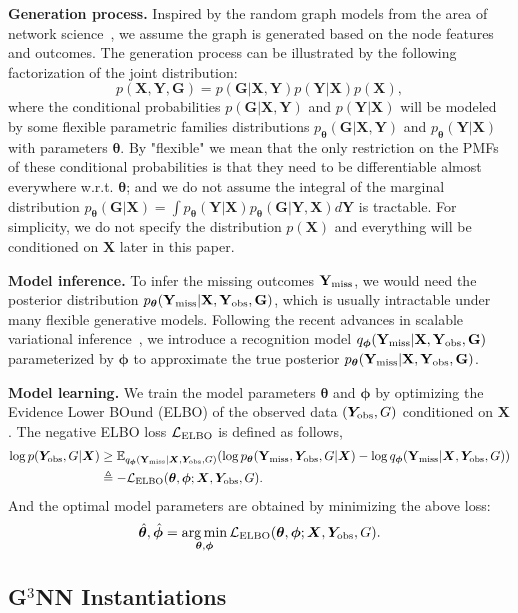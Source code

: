 \documentclass{article}
\newcommand{\vpara}[1]{\vspace{0.05in}\noindent\textbf{#1 }}
\def\rmG{{\mathbf{G}}}
\def\rmX{{\mathbf{X}}}
\def\rmY{{\mathbf{Y}}}
\def\vtheta{{\bm{\theta}}}
\def\mX{{\bm{X}}}
\def\mY{{\bm{Y}}}
\def\gL{{\mathcal{L}}}
\newcommand{\E}{\mathbb{E}}
\DeclareMathOperator*{\argmin}{arg\,min}
\newcommand{\Yobs}{\mY_{\rm{obs}}}
\newcommand{\rYmiss}{\rmY_{\rm{miss}}}
\newcommand{\rYobs}{\rmY_{\rm{obs}}}
\def\vphi{{\bm{\phi}}}
\begin{document}
\vpara{Generation process.} Inspired by the random graph models from the area of network science~\cite{newman2010networks}, we assume the graph is generated based on the node features and outcomes. The generation process can be illustrated by the following factorization of the joint distribution:
	$$p(\rmX, \rmY, \rmG) = p(\rmG|\rmX, \rmY)p(\rmY|\rmX)p(\rmX),$$
where the conditional probabilities $p(\rmG|\rmX, \rmY)$ and $p(\rmY|\rmX)$ will be modeled by some flexible parametric families distributions $p_{\vtheta}(\rmG|\rmX, \rmY)$ and $p_{\vtheta}(\rmY|\rmX)$ with parameters $\vtheta$. By "flexible" we mean that the only restriction on the PMFs of these conditional probabilities is that they need to be differentiable almost everywhere w.r.t. $\vtheta$; and we do not assume the integral of the marginal distribution $p_{\vtheta}(\rmG|\rmX) = \int p_{\vtheta}(\rmY|\rmX)p_{\vtheta}(\rmG|\rmY, \rmX)d\rmY$ is tractable. For simplicity, we do not specify the distribution $p(\rmX)$ and everything will be conditioned on $\rmX$ later in this paper.

\vpara{Model inference.} To infer the missing outcomes $\rYmiss$, we would need the posterior distribution $p_{\vtheta}(\rYmiss|\rmX, \rYobs, \rmG)$, which is usually intractable under many flexible generative models. Following the recent advances in scalable variational inference~\cite{kingma2013auto,kingma2014semi}, we introduce a recognition model $q_{\vphi}(\rYmiss|\rmX, \rYobs, \rmG)$ parameterized by $\vphi$ to approximate the true posterior $p_{\vtheta}(\rYmiss|\rmX, \rYobs, \rmG)$. 

\vpara{Model learning.} We train the model parameters $\vtheta$ and $\vphi$ by optimizing the Evidence Lower BOund (ELBO) of the observed data $(\Yobs, G)$ conditioned on $\mX$. The negative ELBO loss $\gL_{\rm{ELBO}}$ is defined as follows,
\begin{align*}
	\log p(\Yobs, G|\mX) &\geq \E_{q_{\vphi}(\rYmiss |\mX, \Yobs, G)}(\log p_{\vtheta}(\rYmiss, \Yobs, G|\mX)-\log q_{\vphi}(\rYmiss|\mX, \Yobs, G)) \\
    &\triangleq - \gL_{\rm{ELBO}}(\vtheta, \vphi;\mX, \Yobs, G).
\end{align*}
And the optimal model parameters are obtained by minimizing the above loss:
$$\hat{\vtheta}, \hat{\vphi} = \argmin_{\vtheta, \vphi} \gL_{\rm{ELBO}}(\vtheta, \vphi;\mX, \Yobs, G).$$

\subsection{G$^3$NN Instantiations}
\end{document}
